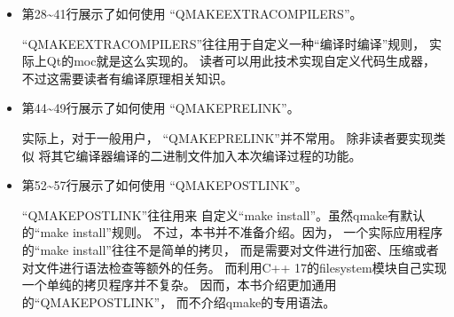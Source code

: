 \begin{itemize}
\item 第28{\sourcefonttwo\~{}}41行展示了如何使用
“QMAKE\underline{\hspace{0.5em}}EXTRA\underline{\hspace{0.5em}}COMPILERS”。

“QMAKE\underline{\hspace{0.5em}}EXTRA\underline{\hspace{0.5em}}COMPILERS”往往用于自定义一种“编译时编译”规则，
实际上Qt的moc就是这么实现的。
读者可以用此技术实现自定义代码生成器，
不过这需要读者有编译原理相关知识。
\item 第44{\sourcefonttwo\~{}}49行展示了如何使用
“QMAKE\underline{\hspace{0.5em}}PRE\underline{\hspace{0.5em}}LINK”。

实际上，对于一般用户，
“QMAKE\underline{\hspace{0.5em}}PRE\underline{\hspace{0.5em}}LINK”并不常用。
除非读者要实现类似
将其它编译器编译的二进制文件加入本次编译过程的功能。
\item 第52{\sourcefonttwo\~{}}57行展示了如何使用
“QMAKE\underline{\hspace{0.5em}}POST\underline{\hspace{0.5em}}LINK”。

“QMAKE\underline{\hspace{0.5em}}POST\underline{\hspace{0.5em}}LINK”往往用来
自定义“make install”。虽然qmake有默认的“make install”规则。
不过，本书并不准备介绍。因为，
一个实际应用程序的“make install”往往不是简单的拷贝，
而是需要对文件进行加密、压缩或者对文件进行语法检查等额外的任务。
而利用C{\sourcefonttwo{}+}{\sourcefonttwo{}+} 17的filesystem模块自己实现一个单纯的拷贝程序并不复杂。
因而，本书介绍更加通用的“QMAKE\underline{\hspace{0.5em}}POST\underline{\hspace{0.5em}}LINK”，
而不介绍qmake的专用语法。
\end{itemize}



